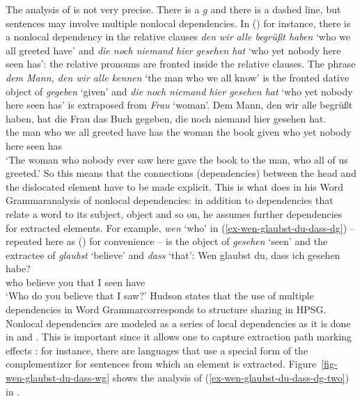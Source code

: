 The analysis of \citet{GO2009a} is not very precise. There is a $g$ and there is a dashed line, but
sentences may involve multiple nonlocal dependencies. In () for instance, there is a nonlocal dependency
in the relative clauses \emph{den wir alle begrüßt haben} `who we all greeted have' and \emph{die noch niemand hier
  gesehen hat} `who yet nobody here seen has': the relative pronouns are fronted inside the relative clauses. The phrase \emph{dem Mann, den wir alle
  kennen} `the man who we all know' is the fronted dative object of \emph{gegeben} `given' and \emph{die noch niemand hier gesehen
  hat} `who yet nobody here seen has' is extraposed from \emph{Frau} `woman'.
\ea
\gll Dem Mann, den wir alle begrüßt haben, hat die Frau das Buch gegeben, die noch niemand hier gesehen hat.\\
     the man   who we all greeted have      has the woman the book given who yet nobody here seen has\\
\glt `The woman  who nobody ever saw here gave the book to the man, who all of us greeted.'
\z
So this means that the connections (dependencies) between the head and the dislocated element have
to be made explicit. This is what \citet{Hudson97a,Hudson2000a} does in his Word
Grammar\indexwg analysis of nonlocal dependencies: in addition to dependencies that relate a word to
its subject, object and so on, he assumes further dependencies for extracted elements. For example,
\emph{wen} `who' in (\ref{ex-wen-glaubst-du-dass-dg}) -- repeated here as () for convenience -- is the object of \emph{gesehen} `seen' and the extractee of
\emph{glaubst} `believe' and \emph{dass} `that': 
\ea
\label{ex-wen-glaubst-du-dass-dg-two}
\gll Wen glaubst du, dass ich gesehen habe?\\
     who believe you that I seen have\\
\glt `Who do you believe that I saw?'
\z
Hudson states that the use of multiple dependencies in Word Grammar\indexwg corresponds to structure
sharing in HPSG\indexhpsg \citep[]{Hudson97a}. Nonlocal dependencies are modeled as a series
of local dependencies as it is done in \gpsg and \hpsg. This is important since it allows one to
capture extraction path marking effects \citep*[--2, Section~3.2]{BMS2001a}: for instance,
there are languages that use a special form of the complementizer for sentences from which an
element is extracted. Figure~\vref{fig-wen-glaubst-du-dass-wg} shows the analysis of
(\ref{ex-wen-glaubst-du-dass-dg-two}) in \wg.
